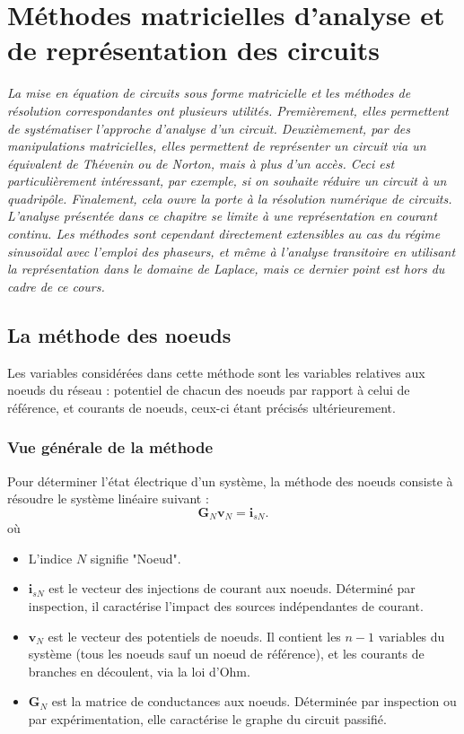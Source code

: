 
\chapter{Méthodes matricielles  d'analyse et\\ de représentation des circuits}
\label{sec:methodes-generales}

\textit{La mise en équation de circuits sous forme matricielle et les méthodes de résolution correspondantes ont plusieurs utilités. Premièrement, elles permettent de systématiser l'approche d'analyse d'un circuit. Deuxièmement, par des manipulations matricielles, elles permettent de représenter un circuit via un équivalent de Thévenin ou de Norton, mais à plus d'un accès. Ceci est particulièrement intéressant, par exemple, si on souhaite réduire un circuit à un quadripôle. Finalement, cela ouvre la porte à la résolution numérique de circuits.
L'analyse présentée dans ce chapitre se limite à une représentation  en courant continu. Les méthodes sont cependant directement extensibles au cas du régime sinusoïdal avec l'emploi des phaseurs, et même à l'analyse transitoire en utilisant la représentation dans le domaine de Laplace, mais ce dernier point est hors du cadre de ce cours. }

\section{La méthode des noeuds}

Les variables considérées dans cette méthode sont les variables relatives aux noeuds du réseau : potentiel de chacun des noeuds par rapport à celui de référence, et courants de noeuds, ceux-ci étant précisés ultérieurement.

\subsection{Vue générale de la méthode}
Pour déterminer l'état électrique d'un système, la méthode des noeuds consiste à résoudre le système linéaire suivant : 
$$\mathbf{G}_N \mathbf{v}_N = \mathbf{i}_{sN}.$$
où 
\begin{itemize}
\item L'indice $N$ signifie "Noeud".
\item $\mathbf{i}_{sN}$ est le vecteur des injections de courant aux noeuds. Déterminé par inspection, il caractérise l'impact des sources indépendantes de courant.
\item $\mathbf{v}_N$ est le vecteur des potentiels de noeuds. Il contient les $n-1$ variables du système (tous les noeuds sauf un noeud de référence), et les courants de branches en découlent, via la loi d'Ohm.
\item $\mathbf{G}_N$ est la matrice de conductances aux noeuds. Déterminée par inspection ou par expérimentation, elle caractérise le graphe du circuit passifié.
\end{itemize}

